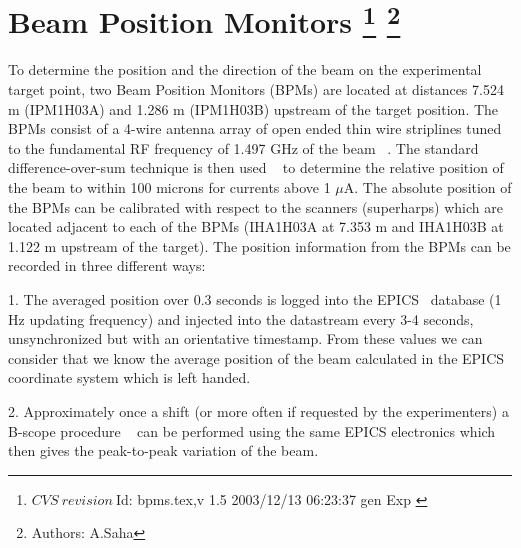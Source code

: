 \section[Beam Position Monitors]{Beam Position Monitors
\footnote{
  $CVS~revision~ $Id: bpms.tex,v 1.5 2003/12/13 06:23:37 gen Exp $ $
}
\footnote{Authors: A.Saha }
}

To determine the position and the direction of the beam on the experimental 
target point, two Beam Position Monitors (BPMs) are located at distances 7.524 m 
(IPM1H03A) and 1.286 m (IPM1H03B) upstream of the target position. 
The BPMs consist of a 4-wire antenna array of open ended thin wire striplines 
tuned to the fundamental RF frequency of 1.497 GHz of the beam ~\cite{bi:bar90}. The 
standard difference-over-sum technique is then used ~\cite{bi:HW} to determine the 
relative position of the beam to within 100 microns for currents
above 1 $\mu $A. The absolute  position of the BPMs can be calibrated with respect to the 
scanners (superharps) which are located adjacent to each of the BPMs (IHA1H03A 
at 7.353 m and IHA1H03B at 1.122 m upstream of the target). 
The position information from the 
BPMs can be recorded in three different ways:


1. The averaged position over 0.3 seconds is logged into the EPICS~\cite{EPICSwww} database (1 
Hz updating frequency) and injected into the datastream every 3-4 seconds, 
unsynchronized but with an orientative timestamp. From these values we can 
consider that we know the average position of the beam calculated in the EPICS 
coordinate system which is left handed.

\vskip 0.5cm

2. Approximately once a shift (or more often if requested by the experimenters) 
a B-scope procedure ~\cite{bi:TP} can be performed using the same EPICS electronics 
which then gives the peak-to-peak variation of the beam.

\vskip 0.5cm

